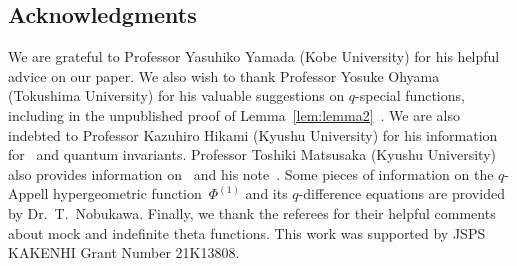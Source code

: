 \documentclass[pdftex]{sigma}
\numberwithin{equation}{section}
\theoremstyle{definition}
\begin{document}
\subsection*{Acknowledgments}
We are grateful to Professor Yasuhiko Yamada (Kobe University) for his helpful advice on our paper.
We also wish to thank Professor Yosuke Ohyama (Tokushima University) for his valuable suggestions on $q$-special functions, including in the unpublished proof of Lemma~\ref{lem:lemma2}~\cite{O2}.
We are also indebted to Professor Kazuhiro Hikami (Kyushu University) for his information for~\cite{GW} and quantum invariants.
Professor Toshiki Matsusaka (Kyushu University) also provides information on~\cite{GW} and his note~\cite{M}.
Some pieces of information on the $q$-Appell hypergeometric function~$\Phi ^{(1)}$ and its $q$-difference equations are provided by Dr.\ T.~Nobukawa.
Finally, we thank the referees for their helpful comments about mock and indefinite theta functions.
This work was supported by JSPS KAKENHI Grant Number 21K13808.
\end{document}
